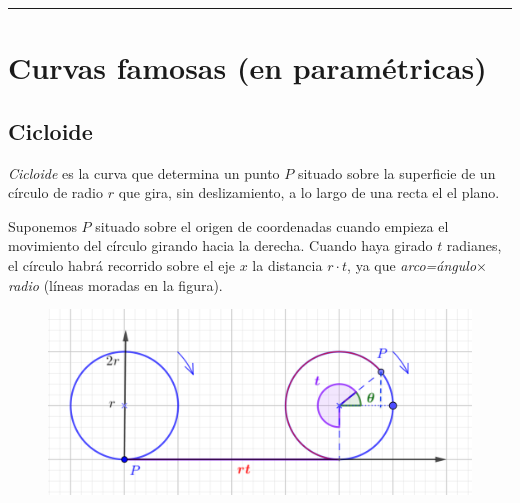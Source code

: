 \begin{flushright}\textcolor{teal}{\rule{250pt}{0.2pt}}	\end{flushright}



\section{Curvas famosas \small{(en paramétricas)}}

\vspace{-5mm}



\subsection{Cicloide}
\vspace{-5mm}

\emph{Cicloide} es la curva que determina un punto $P$ situado sobre la superficie de un círculo de radio $r$ que gira, sin deslizamiento,  a lo largo de una recta el el plano. 

\begin{multicols}{2}
Suponemos $P$ situado sobre el origen de coordenadas cuando empieza el movimiento del círculo girando hacia la derecha. Cuando haya girado $t$ radianes, el círculo habrá recorrido sobre el eje $x$ la distancia $r\cdot t$, ya que \emph{arco=ángulo$\times$radio}	(líneas moradas en la figura).
\begin{figure}[H]
	\centering
	\includegraphics[width=.5\textwidth]{img-polares/polares07.png}
	\end{figure}
\end{multicols}

